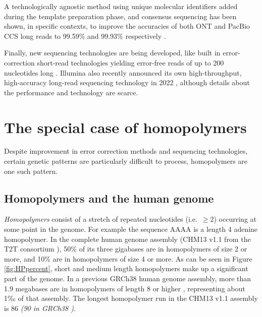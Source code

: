 \documentclass[
  11pt,
  twoside,
  BCOR=10mm,
  listof=totoc]{scrbook}
\begin{document}
A technologically agnostic method using unique molecular identifiers added during the template preparation phase, and consensus sequencing has been shown, in specific contexts, to improve the accuracies of both ONT and PacBio CCS long reads to 99.59\% and 99.93\% respectively \autocite{karstHighaccuracyLongreadAmplicon2021}.

Finally, new sequencing technologies are being developed, like built in error-correction short-read technologies yielding error-free reads of up to 200 nucleotides long \autocite{chenHighlyAccurateFluorogenic2017}. Illumina also recently announced its own high-throughput, high-accuracy long-read sequencing technology in 2022 \autocite{HighPerformanceLong}, although details about the performance and technology are scarce.

\hypertarget{the-special-case-of-homopolymers}{%
\section{The special case of homopolymers}\label{the-special-case-of-homopolymers}}

Despite improvement in error correction methods and sequencing technologies, certain genetic patterns are particularly difficult to process, homopolymers are one such pattern.

\hypertarget{homopolymers-and-the-human-genome}{%
\subsection{Homopolymers and the human genome}\label{homopolymers-and-the-human-genome}}

\emph{Homopolymers} consist of a stretch of repeated nucleotides (i.e.~\(\geq 2\)) occurring at some point in the genome. For example the sequence AAAA is a length 4 adenine homopolymer. In the complete human genome assembly (CHM13 v1.1 from the T2T consortium \autocite{nurk2022}), 50\% of its three gigabases are in homopolymers of size 2 or more, and 10\% are in homopolymers of size 4 or more. As can be seen in Figure \ref{fig:HPpercent}, short and medium length homopolymers make up a significant part of the genome. In a previous GRCh38 human genome assembly, more than 1.9 megabases are in homopolymers of length 8 or higher \autocite{booeshaghiPseudoalignmentFacilitatesAssignment2022}, representing about 1‰ of that assembly. The longest homopolymer run in the CHM13 v1.1 assembly is 86 \emph{(90 in GRCh38 \autocite{booeshaghiPseudoalignmentFacilitatesAssignment2022})}.
\end{document}
